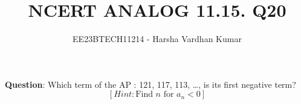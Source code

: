 \documentclass[journal,12pt,twocolumn]{IEEEtran}
\title{NCERT ANALOG 11.15. Q20}
\author{EE23BTECH11214 - Harsha Vardhan Kumar}
\begin{document}
\maketitle
\textbf{Question}:
Which term of the AP : 121, 117, 113, \ldots, is its first negative
term?\\
$$[Hint: \text{Find } n \text{ for } a_n < 0]$$
\end{document}
